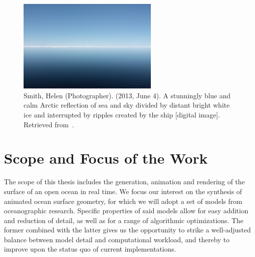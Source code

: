 %
%
%
\begin{figure}
\centering
\includegraphics[width=0.61\textwidth]{figures/helen-smith-arcticsea.jpg}
\caption{
	Smith, Helen (Photographer).
	(2013, June 4).
	A stunningly blue and calm Arctic reflection of sea and sky divided by distant
	bright white ice and interrupted by ripples created by the ship [digital image].
	Retrieved from~\citet{misc:noaa:arctic}.
	}
\label{fig:ocean:arctic}
\end{figure}
\section{Scope and Focus of the Work}
\label{sec:scope_and_focus}
The scope of this thesis includes the generation, animation and rendering of the
surface of an open ocean in real time. We focus our interest on the synthesis of
animated ocean surface geometry, for which we will adopt a set of models from
oceanographic research. Specific properties of said models allow for
easy addition and reduction of detail, as well as for a range of algorithmic
optimizations. The former combined with the latter gives us the opportunity to
strike a well-adjusted balance between model detail and computational workload,
and thereby to improve upon the status quo of current implementations.

